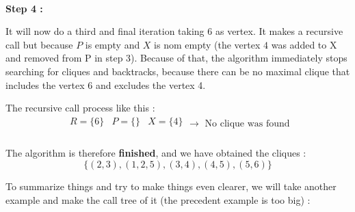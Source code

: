 \\
\hspace*{1cm}  \textbf{Step 4 :}
\\
\begin{minipage}{0.4\textwidth}
\end{minipage}
\begin{minipage}{0.6\textwidth}
    It will now do a third and final iteration taking 6 as vertex. It makes a recursive call but because $P$ is empty and $X$ is nom empty (the vertex $4$ was added to X and removed from P in step 3). Because of that, the algorithm immediately stops searching for cliques and backtracks, because there can be no maximal clique that includes the  vertex 6 and excludes the vertex 4.
\end{minipage}
The recursive call process like this  :
$$ \boxed{
        \begin{array}{lll}
            R = \{6\} & P = \{\} & X = \{4\} \\
        \end{array}
        \rightarrow \text{ No clique was found}
    }$$
\\
The algorithm is therefore \textbf{finished}, and we have obtained the cliques :
$$\{(2,3),(1,2,5),(3,4),(4,5),(5,6)\}$$

To summarize things and try to make things even clearer, we will take another example and make the call tree of it (the precedent example is too big) :

